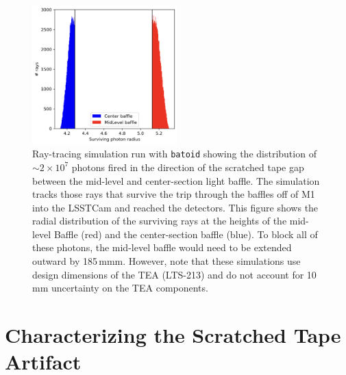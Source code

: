 \documentclass[SE,authoryear,toc]{lsstdoc}
\begin{document}
\begin{figure}[th]
    \centering
    \includegraphics[width=0.5\textwidth]{figures/Baffle Gap Rays.png}
    \caption{Ray-tracing simulation run with \texttt{batoid} showing the distribution of $\sim 2\times 10^7$ photons fired in the direction of the scratched tape gap between the mid-level and center-section light baffle. The simulation tracks those rays that survive the trip through the baffles off of M1 into the LSSTCam and reached the detectors. This figure shows the radial distribution of the surviving rays at the heights of the mid-level Baffle (red) and the center-section baffle (blue). To block all of these photons, the mid-level baffle would need to be extended outward by 185\,mmm. However, note that these simulations use design dimensions of the TEA (LTS-213) and do not account for 10\,mm uncertainty on the TEA components.
}
\end{figure}

\section{Characterizing the Scratched Tape Artifact}
\label{sec:brightness}
\end{document}
